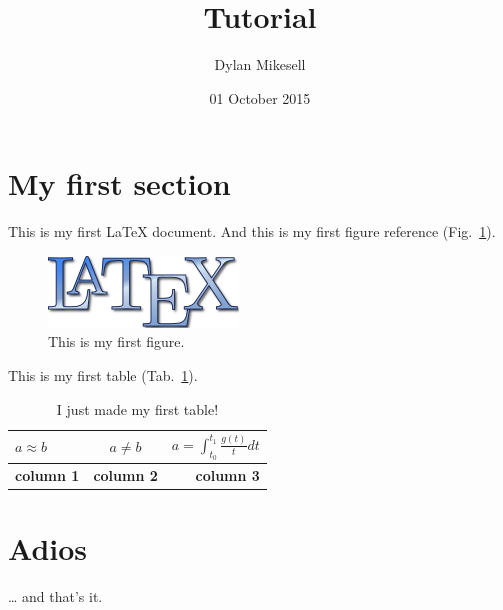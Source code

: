 \documentclass{article}
\author{Dylan Mikesell} %
\title{\latex Tutorial} %
\date{01 October 2015} %
\newcommand{\latex}{\LaTeX\xspace}
\begin{document}
\maketitle %

\newpage

\tableofcontents %

\newpage

\section{My first section} %

This is my first \latex document. And this is my first figure reference (Fig.~\ref{fig:firstFigure}).%

\begin{figure}
	\centering
	\includegraphics[width=0.5\columnwidth]{LaTeXLogo.png}
	\caption{This is my first figure.}
	\label{fig:firstFigure}
\end{figure}

This is my first table (Tab.~\ref{tab:firstTable}).


\begin{table}[b]
	\begin{tabular}{l|c|r}
	$a \approx b$ & $a \ne b$ & $a = \int_{t_0}^{t_1} \frac{g(t)}{t} dt $ \\ \hline
	\textbf{column 1} & \textbf{column 2} & \textbf{column 3} \\ \hline
	\end{tabular}
	\caption{I just made my first table!}
	\label{tab:firstTable}
\end{table}

\newpage

\section{Adios} %

\ldots{} and that's it.
\end{document}
